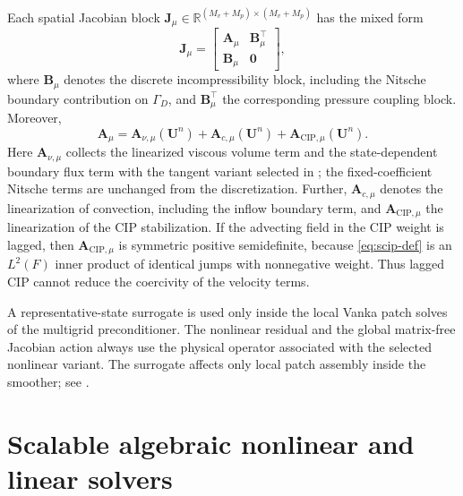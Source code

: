\documentclass[DIV=16]{scrartcl}
\newcommand{\GhD}{\Gamma_{D}}
\begin{document}
Each spatial Jacobian block
$\bm J_\mu\in\mathbb R^{(M_v+M_p)\times(M_v+M_p)}$ has the mixed form
\begin{equation}\label{eq:Jmu-block}
  \bm J_\mu
  =
  \begin{bmatrix}
    \bm A_\mu & \bm B_\mu^\top\\
    \bm B_\mu & \bm 0
  \end{bmatrix},
\end{equation}
where $\bm B_\mu$ denotes the discrete incompressibility block, including the
Nitsche boundary contribution on $\GhD$, and $\bm B_\mu^\top$ the
corresponding pressure coupling block.
Moreover,
\begin{equation}\label{eq:Amu-decomp}
  \bm A_\mu = \bm A_{\nu,\mu}(\bm U^n) + \bm A_{c,\mu}(\bm U^n) + \bm A_{\mathrm{CIP},\mu}(\bm U^n).
\end{equation}
Here $\bm A_{\nu,\mu}$ collects the linearized viscous volume term and the
state-dependent boundary flux term with the tangent variant selected in
; the fixed-coefficient Nitsche terms are unchanged from the
discretization.
Further, $\bm A_{c,\mu}$ denotes the linearization of convection, including the
inflow boundary term, and $\bm A_{\mathrm{CIP},\mu}$ the linearization of the
CIP stabilization.
If the advecting field in the CIP weight is lagged, then
$\bm A_{\mathrm{CIP},\mu}$ is symmetric positive semidefinite, because
\eqref{eq:scip-def} is an $L^2(F)$ inner product of identical jumps with
nonnegative weight.
Thus lagged CIP cannot reduce the coercivity of the velocity terms.

A representative-state surrogate is used only inside the local Vanka patch
solves of the multigrid preconditioner.
The nonlinear residual and the global matrix-free Jacobian action always use the
physical operator associated with the selected nonlinear variant.
The surrogate affects only local patch assembly inside the smoother;
see .


\section{Scalable algebraic nonlinear and linear solvers}
\label{sec:newton-krylov}
\end{document}
